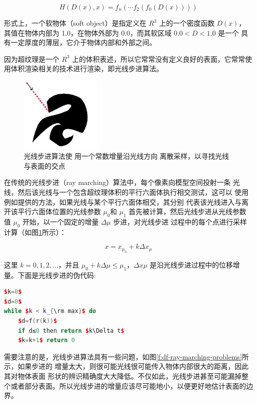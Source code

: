 \begin{equation}
	H(D(x),x)=f_n(\cdots f_2(f_0(D(x))))
\end{equation}

形式上，一个软物体（soft object）是指定义在 $R^{3}$ 上的一个密度函数 $D(x)$， 其值在物体内部为 1.0，在物体外部为 0.0，而其软区域 $0.0 < D < 1.0$ 是一个 具有一定厚度的薄层，它介于物体内部和外部之间。

因为超纹理是一个 $R^{3}$ 上的体积表述，所以它常常没有定义良好的表面，它常常使用体积渲染相关的技术进行渲染，即光线步进算法。

\begin{figure}
	\sidecaption
	\includegraphics[width=0.35\textwidth]{figures/df/ray-marching}
	\caption{光线步进算法使 用一个常数增量沿光线方向 离散采样，以寻找光线与表面的交点}
	\label{f:df-ray-marching}
\end{figure}

在传统的光线步进（ray marching）算法中，每个像素向模型空间投射一条 光线，然后该光线与一个包含超纹理体积的平行六面体执行相交测试，这可以 使用例如\cite{a:Onraytracingparametricsurfaces}提供的方法，如果光线与某个平行六面体相交，其分别 代表该光线进入与离开该平行六面体位置的光线参数 $\mu_0$和 $\mu_1$ 首先被计算，然后光线步进从光线参数值 $\mu_0$ 开始，以一个固定的增量 $\Delta\mu$ 步进，对光线步进 过程中的每个点进行采样计算（如图\ref{f:df-ray-marching}所示）：

\begin{equation}
	x=x_{\mu_0}+k\Delta x_{\mu}
\end{equation}

这里 $k = 0, 1, 2, ...$，并且 $\mu_0 + k\Delta\mu\leq \mu_1$，$\Delta x \mu$ 是沿光线步进过程中的位移增量。下面是光线步进的伪代码:

\begin{lstlisting}[language=C++, mathescape=true]
$k=0$
$d=0$
while $k < k_{\rm max}$ do
	$d=f(r(k))$
	if d≤0 then return $k\Delta t$
	$k=k+1$ return 0
\end{lstlisting}

需要注意的是，光线步进算法具有一些问题，如图\ref{f:df-ray-marching-problems}所示，如果步进的 增量太大，则很可能光线很可能传入物体内部很大的距离，因此其对物体表面 形状的辨识精确度大大降低。不仅如此，光线步进甚至可能漏掉整个或者部分表面。所以光线步进的增量应该尽可能地小，以便更好地估计表面的边界。

